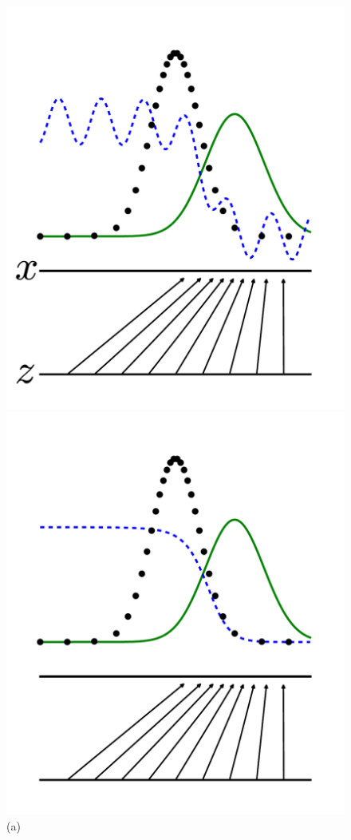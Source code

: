 \begin{figure}[h]
	\begin{minipage}[t]{.5\columnwidth}
		 \includegraphics[]{fig1.pdf}
		 \caption{(a)}
	\end{minipage}
		\begin{minipage}[c]{.5\columnwidth}
		 \includegraphics[]{fig2.pdf}

\end{minipage}
\end{figure}
